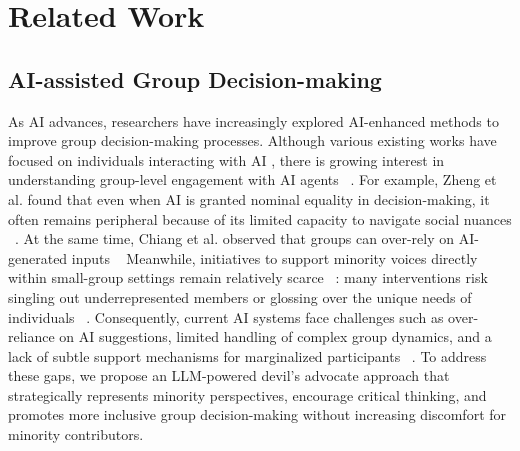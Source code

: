 \section{Related Work}
\subsection{AI-assisted Group Decision-making}
As AI advances, researchers have increasingly explored AI-enhanced methods to improve group decision-making processes. Although various existing works have focused on individuals interacting with AI \cite{laiScienceHumanAIDecision2021}, there is growing interest in understanding group-level engagement with AI agents ~\cite{maRecommenderExploratoryStudy2024,liuProactiveConversationalAgents2024,kimBotBunchFacilitating2020,doHowShouldAgent2022,seboRobotsGroupsTeams2020,houdeControllingAIAgent2025,wangUnderstandingDesignSpace2022,zhangBreakingBarriersBuilding2025}. For example, Zheng et al. found that even when AI is granted nominal equality in decision-making, it often remains peripheral because of its limited capacity to navigate social nuances ~\cite{zhengCompetentRigidIdentifying2023}. At the same time, Chiang et al. observed that groups can over-rely on AI-generated inputs ~\cite{chiangAreTwoHeads2023,chiangEnhancingAIAssistedGroup2024} Meanwhile, initiatives to support minority voices directly within small-group settings remain relatively scarce ~\cite{hwangSoundSupportGendered2024}: many interventions risk singling out underrepresented members or glossing over the unique needs of individuals ~\cite{stauferSilencingRiskNot2024}. Consequently, current AI systems face challenges such as over-reliance on AI suggestions, limited handling of complex group dynamics, and a lack of subtle support mechanisms for marginalized participants  ~\cite{bucincaTrustThinkCognitive2021,chiangEnhancingAIAssistedGroup2024,hwangSoundSupportGendered2024}. To address these gaps, we propose an LLM-powered devil’s advocate approach that strategically represents minority perspectives, encourage critical thinking, and promotes more inclusive group decision-making without increasing discomfort for minority contributors.




